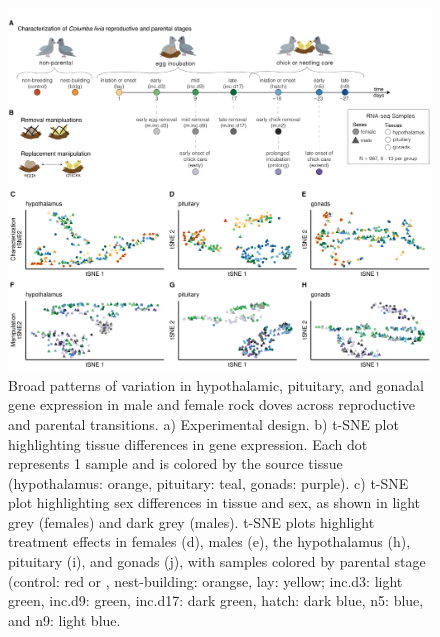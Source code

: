 \begin{figure}[h]
  \centering
  \includegraphics[width=1.0\textwidth]{../../figures/fig1-1}
  \caption{Broad patterns of variation in hypothalamic, pituitary, and gonadal gene expression in male and female rock doves across reproductive and parental transitions. a) Experimental design. b) t-SNE plot highlighting tissue differences in gene expression. Each dot represents 1 sample and is colored by the source tissue (hypothalamus: orange, pituitary: teal, gonads: purple). c) t-SNE plot highlighting sex differences in tissue and sex, as shown in light grey (females) and dark grey (males). t-SNE plots highlight treatment effects in females (d), males (e), the hypothalamus (h), pituitary (i), and gonads (j), with samples colored by parental stage (control: red or , nest-building: orangse, lay: yellow; inc.d3: light green, inc.d9: green, inc.d17: dark green, hatch: dark blue, n5: blue, and n9: light blue.}
  \label{figure:fig1}
\end{figure}

